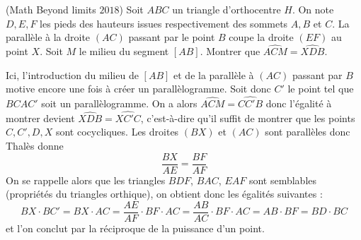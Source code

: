 \begin{exo}
(Math Beyond limits $2018$)
Soit $ABC$ un triangle d'orthocentre $H$. On note $D,E,F$ les pieds des hauteurs issues respectivement des sommets $A,B$ et $C$. La parallèle à la droite $(AC)$ passant par le point $B$ coupe la droite $(EF)$ au point $X$. Soit $M$ le milieu du segment $[AB]$. Montrer que $\widehat{ACM}=\widehat{XDB}$.
\end{exo}

\begin{sol}
\begin{center}
\end{center}

Ici, l'introduction du milieu de $[AB]$ et de la parallèle à $(AC)$ passant par $B$ motive encore une fois à créer un parallèlogramme. Soit donc $C'$ le point tel que $BCAC'$ soit un parallèlogramme. On a alors $\widehat{ACM}=\widehat{CC'B}$ donc l'égalité à montrer devient $\widehat{XDB}=\widehat{XC'C}$, c'est-à-dire qu'il suffit de montrer que les points $C,C',D,X$ sont cocycliques.
Les droites $(BX)$ et $(AC)$ sont parallèles donc Thalès donne
$$\frac{BX}{AE}=\frac{BF}{AF}$$
On se rappelle alors que les triangles $BDF$, $BAC$, $EAF$ sont semblables (propriétés du triangles orthique), on obtient donc les égalités suivantes :
$$BX\cdot BC'= BX\cdot AC=\frac{AE}{AF}\cdot BF\cdot AC=\frac{AB}{AC}\cdot BF\cdot AC=AB\cdot BF=BD\cdot BC$$ et l'on conclut par la réciproque de la puissance d'un point.
\end{sol}

